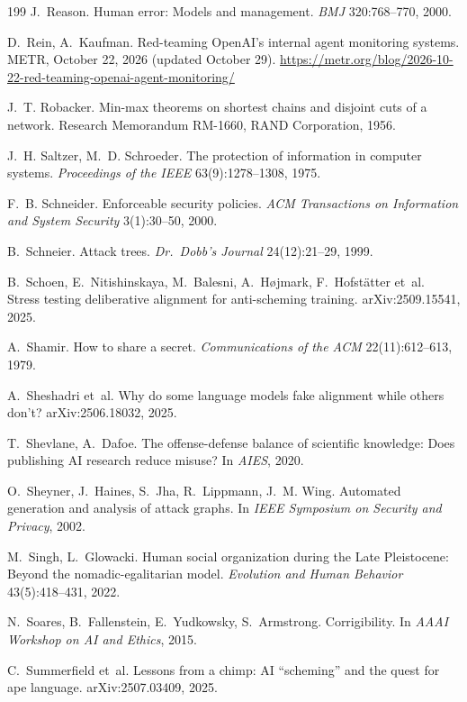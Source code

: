 \documentclass[10pt,twocolumn,letterpaper]{article}
\theoremstyle{definition}
\begin{document}
\begin{thebibliography}{199}
 J.~Reason. Human error: Models and management. \emph{BMJ} 320:768--770, 2000.

 D.~Rein, A.~Kaufman. Red-teaming OpenAI's internal agent monitoring systems. METR, October 22, 2026 (updated October 29). \url{https://metr.org/blog/2026-10-22-red-teaming-openai-agent-monitoring/}

 J.~T. Robacker. Min-max theorems on shortest chains and disjoint cuts of a network. Research Memorandum RM-1660, RAND Corporation, 1956.

 J.~H. Saltzer, M.~D. Schroeder. The protection of information in computer systems. \emph{Proceedings of the IEEE} 63(9):1278--1308, 1975.

 F.~B. Schneider. Enforceable security policies. \emph{ACM Transactions on Information and System Security} 3(1):30--50, 2000.

 B.~Schneier. Attack trees. \emph{Dr.\ Dobb's Journal} 24(12):21--29, 1999.

 B.~Schoen, E.~Nitishinskaya, M.~Balesni, A.~H{\o}jmark, F.~Hofst\"atter et~al. Stress testing deliberative alignment for anti-scheming training. arXiv:2509.15541, 2025.

 A.~Shamir. How to share a secret. \emph{Communications of the ACM} 22(11):612--613, 1979.

 A.~Sheshadri et~al. Why do some language models fake alignment while others don't? arXiv:2506.18032, 2025.

 T.~Shevlane, A.~Dafoe. The offense-defense balance of scientific knowledge: Does publishing AI research reduce misuse? In \emph{AIES}, 2020.

 O.~Sheyner, J.~Haines, S.~Jha, R.~Lippmann, J.~M. Wing. Automated generation and analysis of attack graphs. In \emph{IEEE Symposium on Security and Privacy}, 2002.

 M.~Singh, L.~Glowacki. Human social organization during the Late Pleistocene: Beyond the nomadic-egalitarian model. \emph{Evolution and Human Behavior} 43(5):418--431, 2022.

 N.~Soares, B.~Fallenstein, E.~Yudkowsky, S.~Armstrong. Corrigibility. In \emph{AAAI Workshop on AI and Ethics}, 2015.

 C.~Summerfield et~al. Lessons from a chimp: AI ``scheming'' and the quest for ape language. arXiv:2507.03409, 2025.


\end{thebibliography}
\end{document}
